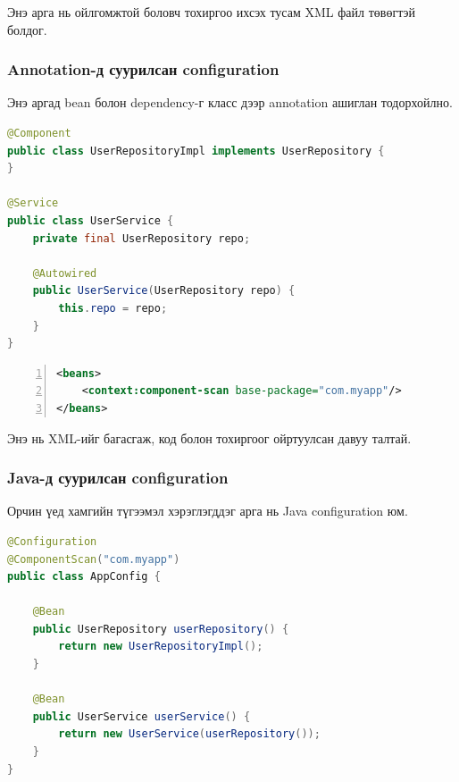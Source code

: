 Энэ арга нь ойлгомжтой боловч тохиргоо ихсэх тусам XML файл төвөгтэй болдог.

\subsubsection{Annotation-д суурилсан configuration}

Энэ аргад bean болон dependency-г класс дээр annotation ашиглан тодорхойлно.

\begin{lstlisting}[language=Java, frame=single, caption={Annotation-д суурилсан bean бүртгэлтийн жишээ}, label={lst:annotation-config-example}]
@Component
public class UserRepositoryImpl implements UserRepository {
}

@Service
public class UserService {
    private final UserRepository repo;

    @Autowired
    public UserService(UserRepository repo) {
        this.repo = repo;
    }
}
\end{lstlisting}

\begin{lstlisting}[language=XML, basicstyle=\ttfamily\small, numbers=left, numberstyle=\tiny\color{gray}, frame=single, caption={Component scan тохиргооны жишээ}, label={lst:component-scan-example}]
<beans>
    <context:component-scan base-package="com.myapp"/>
</beans>
\end{lstlisting}

Энэ нь XML-ийг багасгаж, код болон тохиргоог ойртуулсан давуу талтай.

\newpage
\subsubsection{Java-д суурилсан configuration}

Орчин үед хамгийн түгээмэл хэрэглэгддэг арга нь Java configuration юм.

\begin{lstlisting}[language=Java, frame=single, caption={Java-д суурилсан configuration жишээ}, label={lst:java-config-example}]
@Configuration
@ComponentScan("com.myapp")
public class AppConfig {

    @Bean
    public UserRepository userRepository() {
        return new UserRepositoryImpl();
    }

    @Bean
    public UserService userService() {
        return new UserService(userRepository());
    }
}
\end{lstlisting}

